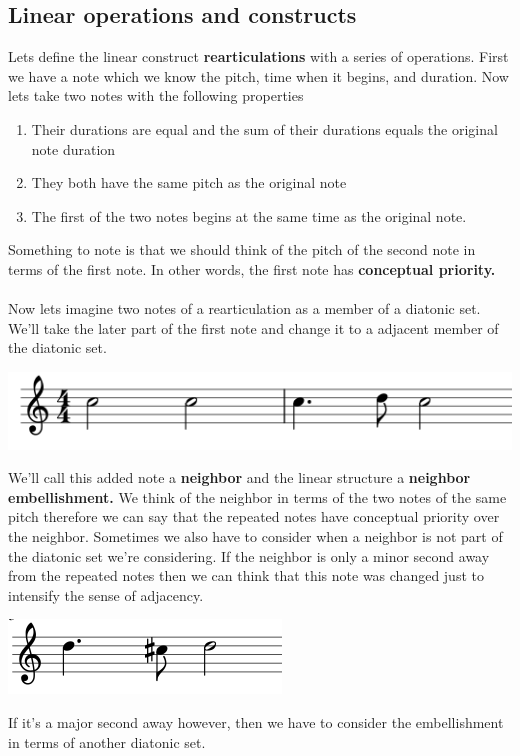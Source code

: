 \documentclass{article}
\begin{document}
\subsection{Linear operations and constructs}
Lets define the linear construct \textbf{rearticulations} with a series of operations. First we have a note which we know the pitch, time when it begins, and duration. Now lets take two notes with the following properties
\begin{enumerate}
  \item Their durations are equal and the sum of their durations equals the original note duration
  \item They both have the same pitch as the original note
  \item The first of the two notes begins at the same time as the original note.
\end{enumerate}
Something to note is that we should think of the pitch of the second note in terms of the first note. In other words, the first note has \textbf{conceptual priority.}\\\\
Now lets imagine two notes of a rearticulation as a member of a diatonic set. We'll take the later part of the first note and change it to a adjacent member of the diatonic set.
\begin{center}
  \includegraphics[width=0.5\linewidth]{3ex.png}
\end{center}
We'll call this added note a \textbf{neighbor} and the linear structure a \textbf{neighbor embellishment.} We think of the neighbor in terms of the two notes of the same pitch therefore we can say that the repeated notes have conceptual priority over the neighbor. Sometimes we also have to consider when a neighbor is not part of the diatonic set we're considering. If the neighbor is only a minor second away from the repeated notes then we can think that this note was changed just to intensify the sense of adjacency.
\begin{center}
  \includegraphics[width=0.25\linewidth]{3ex2.png}
\end{center}
If it's a major second away however, then we have to consider the embellishment in terms of another diatonic set.
\end{document}
